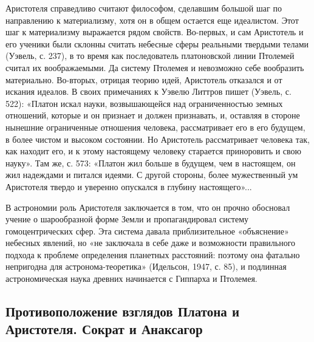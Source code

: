 Аристотеля справедливо считают философом, сделавшим большой шаг по
направлению к материализму, хотя он в общем остается еще идеалистом.
Этот шаг к материализму выражается рядом свойств. Во-первых, и сам
Аристотель и его ученики были склонны считать небесные сферы реальными
твердыми телами (Уэвель, с. 237), в то время как последователь
платоновской линии Птолемей считал их воображаемыми. Да систему
Птолемея и невозможно себе вообразить материально. Во-вторых, отрицая
теорию идей, Аристотель отказался и от искания идеалов. В своих
примечаниях к Уэвелю Литтров пишет (Уэвель, с. 522): «Платон искал
науки, возвышающейся над ограниченностью земных отношений, которые и
он признает и должен признавать, и, оставляя в стороне нынешние
ограниченные отношения человека, рассматривает его в его будущем, в
более чистом и высоком состоянии. Но Аристотель рассматривает человека
так, как находит его, и к этому настоящему человеку старается
приноровить и свою науку». Там же, с. 573: «Платон жил больше в
будущем, чем в настоящем, он жил надеждами и питался идеями. С другой
стороны, более мужественный ум Аристотеля твердо и уверенно опускался
в глубину настоящего»...

В астрономии роль Аристотеля заключается в том, что он прочно
обосновал учение о шарообразной форме Земли и пропагандировал систему
гомоцентрических сфер. Эта система давала приблизительное «объяснение»
небесных явлений, но «не заключала в себе даже и возможности
правильного подхода к проблеме определения планетных расстояний:
поэтому она фатально непригодна для астронома-теоретика» (Идельсон,
1947, с. 85), и подлинная астрономическая наука древних начинается с
Гиппарха и Птолемея.

\subsection{Противоположение взглядов Платона и Аристотеля. Сократ и
Анаксагор}

